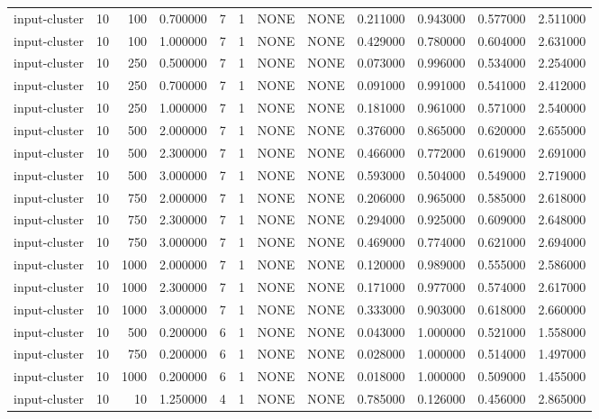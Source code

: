\begin{tabular}{lrrrllllrrrr}
input-cluster & 10 & 100 & 0.700000 & 7 & 1 & NONE & NONE & 0.211000 & 0.943000 & 0.577000 & 2.511000 \\
input-cluster & 10 & 100 & 1.000000 & 7 & 1 & NONE & NONE & 0.429000 & 0.780000 & 0.604000 & 2.631000 \\
input-cluster & 10 & 250 & 0.500000 & 7 & 1 & NONE & NONE & 0.073000 & 0.996000 & 0.534000 & 2.254000 \\
input-cluster & 10 & 250 & 0.700000 & 7 & 1 & NONE & NONE & 0.091000 & 0.991000 & 0.541000 & 2.412000 \\
input-cluster & 10 & 250 & 1.000000 & 7 & 1 & NONE & NONE & 0.181000 & 0.961000 & 0.571000 & 2.540000 \\
input-cluster & 10 & 500 & 2.000000 & 7 & 1 & NONE & NONE & 0.376000 & 0.865000 & 0.620000 & 2.655000 \\
input-cluster & 10 & 500 & 2.300000 & 7 & 1 & NONE & NONE & 0.466000 & 0.772000 & 0.619000 & 2.691000 \\
input-cluster & 10 & 500 & 3.000000 & 7 & 1 & NONE & NONE & 0.593000 & 0.504000 & 0.549000 & 2.719000 \\
input-cluster & 10 & 750 & 2.000000 & 7 & 1 & NONE & NONE & 0.206000 & 0.965000 & 0.585000 & 2.618000 \\
input-cluster & 10 & 750 & 2.300000 & 7 & 1 & NONE & NONE & 0.294000 & 0.925000 & 0.609000 & 2.648000 \\
input-cluster & 10 & 750 & 3.000000 & 7 & 1 & NONE & NONE & 0.469000 & 0.774000 & 0.621000 & 2.694000 \\
input-cluster & 10 & 1000 & 2.000000 & 7 & 1 & NONE & NONE & 0.120000 & 0.989000 & 0.555000 & 2.586000 \\
input-cluster & 10 & 1000 & 2.300000 & 7 & 1 & NONE & NONE & 0.171000 & 0.977000 & 0.574000 & 2.617000 \\
input-cluster & 10 & 1000 & 3.000000 & 7 & 1 & NONE & NONE & 0.333000 & 0.903000 & 0.618000 & 2.660000 \\
input-cluster & 10 & 500 & 0.200000 & 6 & 1 & NONE & NONE & 0.043000 & 1.000000 & 0.521000 & 1.558000 \\
input-cluster & 10 & 750 & 0.200000 & 6 & 1 & NONE & NONE & 0.028000 & 1.000000 & 0.514000 & 1.497000 \\
input-cluster & 10 & 1000 & 0.200000 & 6 & 1 & NONE & NONE & 0.018000 & 1.000000 & 0.509000 & 1.455000 \\
input-cluster & 10 & 10 & 1.250000 & 4 & 1 & NONE & NONE & 0.785000 & 0.126000 & 0.456000 & 2.865000 \\

\end{tabular}
